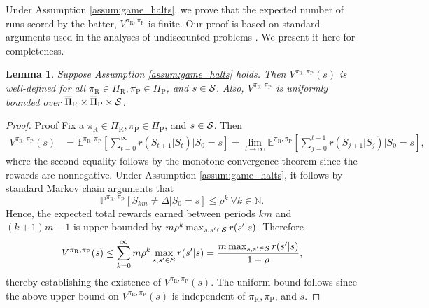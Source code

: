 \documentclass[aoas]{imsart}
\theoremstyle{plain}
\newtheorem{lemma}[theorem]{Lemma}
\theoremstyle{definition}
\begin{document}
       Under Assumption \ref{assum:game_halts}, we prove that the expected number of runs scored by the batter, $V^{\pi_\text{R},\pi_\text{P}}$ is finite. Our proof is based on standard arguments used in the analyses of undiscounted problems \cite[Section 7.2]{bertsekas_dynamic_2012}. We present it here for completeness.  
    
       \begin{lemma}
           \label{lem:sg_pol_val_well_defined}
           Suppose Assumption \ref{assum:game_halts} holds. Then $V^{\pi_\text{R},\pi_\text{P}}(s)$ is well-defined for all $\pi_\text{R} \in \overline\Pi_\text{R}, \pi_\text{P} \in \overline\Pi_\text{P}$, and $s \in {\cal S}$. Also, $V^{\pi_\text{R},\pi_\text{P}}$ is uniformly bounded over $\overline\Pi_\text{R} \times \overline\Pi_\text{P} \times {\cal S}$.  
       \end{lemma}       
       \begin{proof}{Proof}
           Fix a $\pi_\text{R} \in \overline\Pi_\text{R}, \pi_\text{P} \in \overline\Pi_\text{P}$, and $s \in {\cal S}$. Then 
           \begingroup
           \allowdisplaybreaks
           \begin{align*}
               V^{\pi_\text{R},\pi_\text{P}}(s) &= \mathbb{E}^{\pi_\text{R},\pi_\text{P}}\left[\sum_{t=0}^\infty r(S_{t+1}|S_t) \Big| S_0 = s\right] = \lim_{t \to \infty} \mathbb{E}^{\pi_\text{R},\pi_\text{P}}\left[\sum_{j=0}^{t-1} r(S_{j+1}|S_j) \Big| S_0 = s\right],
           \end{align*}
           \endgroup
           where the second equality follows by the monotone convergence theorem since the rewards are nonnegative. Under Assumption \ref{assum:game_halts}, it follows by standard Markov chain arguments that
           \[
           \mathbb{P}^{\pi_\text{R}, \pi_\text{P}}[S_{km} \neq \Delta|S_0=s] \leq \rho^k \ \forall k \in \mathbb{N}.
           \]
           Hence, the expected total rewards earned between periods $km$ and $(k+1)m - 1$ is upper bounded by $m\rho^k \max_{s,s' \in {\cal S}}r(s'|s)$. Therefore
           \[
           V^{\pi_\text{R},\pi_\text{P}}(s) \leq \sum_{k=0}^\infty m\rho^k \max_{s,s' \in {\cal S}}r(s'|s) = \frac{m \max_{s,s' \in {\cal S}}r(s'|s)}{1-\rho},
           \]
           thereby establishing the existence of $V^{\pi_\text{R},\pi_\text{P}}(s)$. The uniform bound follows since the above upper bound on $V^{\pi_\text{R},\pi_\text{P}}(s)$ is independent of $\pi_\text{R},\pi_\text{P}$, and $s$.
       \end{proof}
       
\end{document}
